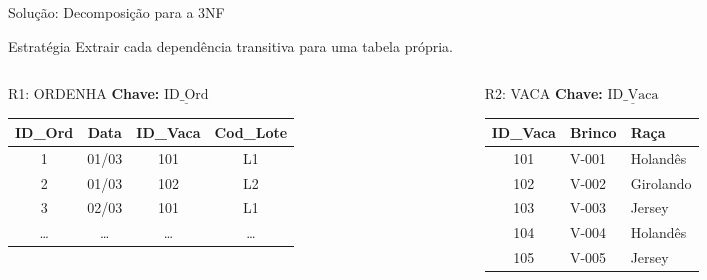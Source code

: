 \documentclass[9pt]{beamer}
\begin{document}
\begin{frame}{Solução: Decomposição para a 3NF}
\small

\begin{block}{Estratégia}
Extrair cada dependência transitiva para uma tabela própria.
\end{block}

\vspace{0.2cm}

\begin{columns}[t]
    \begin{column}{0.32\textwidth}
        \begin{exampleblock}{\small R1: ORDENHA}
        \textbf{Chave:} $\underline{\text{ID\_Ord}}$
        \vspace{0.1cm}

        \tiny
        \centering
        \begin{tabular}{|c|c|c|c|}
        \hline
        \textbf{ID\_Ord} & \textbf{Data} & \textbf{ID\_Vaca} & \textbf{Cod\_Lote} \\ \hline
        1  & 01/03 & 101 & L1 \\ \hline
        2  & 01/03 & 102 & L2 \\ \hline
        3  & 02/03 & 101 & L1 \\ \hline
        \ldots & \ldots & \ldots & \ldots \\ \hline
        \end{tabular}
        \end{exampleblock}
    \end{column}

    \begin{column}{0.31\textwidth}
        \begin{exampleblock}{\small R2: VACA}
        \textbf{Chave:} $\underline{\text{ID\_Vaca}}$
        \vspace{0.1cm}

        \tiny
        \centering
        \begin{tabular}{|c|l|l|}
        \hline
        \textbf{ID\_Vaca} & \textbf{Brinco} & \textbf{Raça} \\ \hline
        101 & V-001 & Holandês  \\ \hline
        102 & V-002 & Girolando \\ \hline
        103 & V-003 & Jersey    \\ \hline
        104 & V-004 & Holandês  \\ \hline
        105 & V-005 & Jersey    \\ \hline
        \end{tabular}
        \end{exampleblock}
    \end{column}


\end{columns}
\end{frame}
\end{document}
